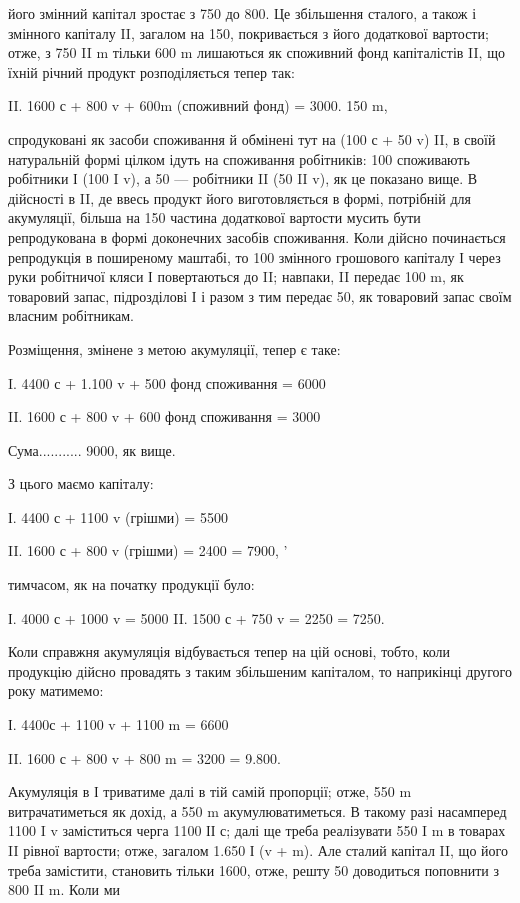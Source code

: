 \parcont{}  %
його змінний капітал зростає з 750 до 800. Це збільшення сталого, а
також і змінного капіталу II, загалом на 150, покривається з його додаткової
вартости; отже, з 750 II m тільки 600 m лишаються як споживний
фонд капіталістів II, що їхній річний продукт розподіляється тепер
так:

II. 1600 с + 800 v + 600m (споживний фонд) = 3000.    150 m,

спродуковані як засоби споживання й обмінені тут на (100 с + 50 v) II,
в своїй натуральній формі цілком ідуть на споживання робітників: 100
споживають робітники І (100 I v), а 50 — робітники II (50 II v), як це
показано вище. В дійсності в II, де ввесь продукт його виготовляється
в формі, потрібній для акумуляції, більша на 150 частина додаткової
вартости мусить бути репродукована в формі доконечних засобів
споживання. Коли дійсно починається репродукція в поширеному
маштабі, то 100 змінного грошового капіталу І через руки робітничої
кляси І повертаються до II; навпаки, II передає 100 m, як товаровий
запас, підрозділові І і разом з тим передає 50, як товаровий запас своїм
власним робітникам.

Розміщення, змінене з метою акумуляції, тепер є таке:

I.    4400 с + 1.100 v + 500 фонд споживання = 6000

II.    1600 с + 800 v + 600 фонд споживання = 3000

Сума........... 9000, як вище.

З цього маємо капіталу:

І. 4400 с + 1100 v (грішми) = 5500

II. 1600 с + 800 v (грішми) = 2400
= 7900, ’

тимчасом, як на початку продукції було:

І. 4000 с + 1000 v = 5000
II. 1500 с + 750 v = 2250
= 7250.

Коли справжня акумуляція відбувається тепер на цій основі, тобто,
коли продукцію дійсно провадять з таким збільшеним капіталом, то
наприкінці другого року матимемо:

І. 4400с + 1100 v + 1100 m = 6600

II. 1600 с + 800 v + 800 m = 3200
= 9.800.

Акумуляція в І триватиме далі в тій самій пропорції; отже, 550 m
витрачатиметься як дохід, а 550 m акумулюватиметься. В такому разі насамперед
1100 I v заміститься черга 1100 ІІ с; далі ще треба реалізувати
550 I m в товарах II рівної вартости; отже, загалом 1.650 І
(v + m). Але сталий капітал II, що його треба замістити, становить
тільки 1600, отже, решту 50 доводиться поповнити з 800 II m. Коли ми
\parbreak{}  %
